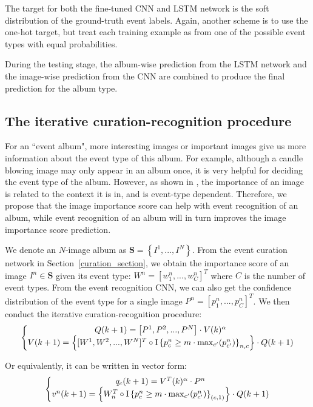 \documentclass[runningheads]{llncs}
\begin{document}
The target for both the fine-tuned CNN and LSTM network is the soft distribution of the ground-truth event labels. Again, another scheme is to use the one-hot target, but treat each training example as from one of the possible event types with equal probabilities. 

During the testing stage, the album-wise prediction from the LSTM network and the image-wise prediction from the CNN are combined to produce the final prediction for the album type. 

\subsection{The iterative curation-recognition procedure}
For an ``event album", more interesting images or important images give us more information about the event type of this album. For example, although a candle blowing image may only appear in an album once, it is very helpful for deciding the event type of the album. However, as shown in \cite{CVPR}, the importance of an image is related to the context it is in, and is event-type dependent. Therefore, we propose that the image importance score can help with event recognition of an album, while event recognition of an album will in turn improves the image importance score prediction.

We denote an $N$-image album as $\mathbf{S}= \left \{I^{1}, ..., I^{N}  \right \}$. From the event curation network in Section~\ref{curation_section}, we obtain the importance score of an image $I^{n} \in \mathbf{S} $ given its event type: $W^{n}= \left [w_{1}^{n} , ..., w_{C}^{n}  \right ]^{T}$ where $C$ is the number of event types. From the event recognition CNN, we can also get the confidence distribution of the event type for a single image $P^{n}= \left [ p_{1}^{n} , ..., p_{C}^{n}  \right ]^{T}$. We then conduct the iterative curation-recognition procedure:
\begin{equation}
\left\{\begin{matrix}
Q(k+1) = \left [ P^{1}, P^{2}, ..., P^{N} \right ] \cdot V(k)^{\alpha }\\ 
V(k+1) = \left \{[W^{1}, W^{2}, ..., W^{N}]^{T}\circ\textup{I}\left \{ p^{n}_{c}\geq m \cdot \max_{c'}(p^{n}_{c'}) \right \}_{n,c}\right \} \cdot  Q(k+1)
\end{matrix}\right.
\label{eq1}
\end{equation}

Or equivalently, it can be written in vector form:
\begin{equation}
\left\{\begin{matrix}
q_{c}(k+1) = V^{T}(k)^{\alpha }\cdot  P^{n}\\ 
v^{n}(k+1) = \left \{W_{n}^{T} \circ \textup{I}\left \{ p^{n}_{c}\geq m\cdot \max_{c'}(p^{n}_{c'}) \right \}_{(c,1)}\right \} \cdot  Q(k+1)
\end{matrix}\right.
\end{equation}
\end{document}
